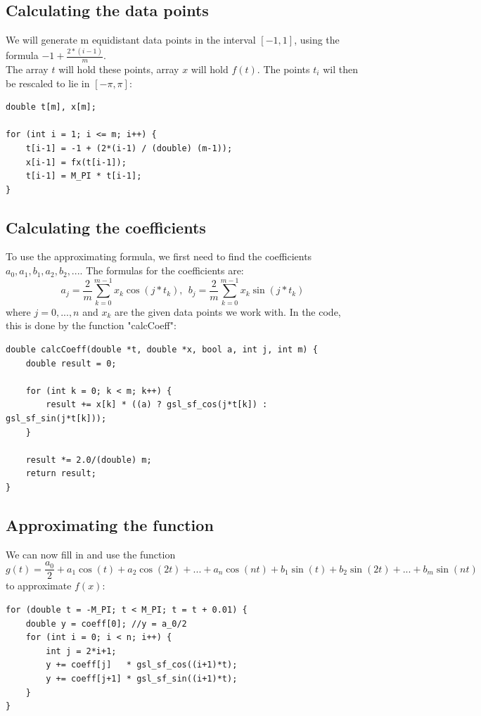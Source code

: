 \documentclass[11pt, a4paper, titlepage, openright]{article}
\begin{document}
    \subsection{Calculating the data points}
    We will generate m equidistant data points in the interval \([-1, 1]\), using the formula \( -1 + \frac{2*(i-1)}{m} \).  \\
    The array \(t\) will hold these points, array \(x\) will hold \( f(t) \). The points \(t_i\) wil then be rescaled to lie in \( [-\pi, \pi] \):
\begin{lstlisting}
double t[m], x[m];

for (int i = 1; i <= m; i++) {
    t[i-1] = -1 + (2*(i-1) / (double) (m-1));
    x[i-1] = fx(t[i-1]);
    t[i-1] = M_PI * t[i-1];
}
\end{lstlisting}
    \subsection{Calculating the coefficients}
    To use the approximating formula, we first need to find the coefficients \( a_0, a_1, b_1, a_2, b_2, ... \).
    The formulas for the coefficients are:
    \[ a_j = \frac{2}{m} \sum_{k=0}^{m-1}x_k \cos(j*t_k),\ \  b_j = \frac{2}{m} \sum_{k=0}^{m-1}x_k \sin(j*t_k) \]
    where \( j = 0, ..., n \) and \( x_k \) are the given data points we work with.
    In the code, this is done by the function "calcCoeff":
\begin{lstlisting}
double calcCoeff(double *t, double *x, bool a, int j, int m) {
    double result = 0;

    for (int k = 0; k < m; k++) {
        result += x[k] * ((a) ? gsl_sf_cos(j*t[k]) : gsl_sf_sin(j*t[k]));
    }

    result *= 2.0/(double) m;
    return result;
}
\end{lstlisting}
    \newpage
    \subsection{Approximating the function}
    We can now fill in and use the function
    \[ g(t) = \frac{a_0}{2} + a_1 \cos (t) + a_2 \cos(2t) + ... + a_n \cos(nt) + b_1 \sin (t) + b_2 \sin (2t) + ... + b_m \sin (nt) \]
    to approximate \(f(x)\):
    \\
\begin{lstlisting}
for (double t = -M_PI; t < M_PI; t = t + 0.01) {
    double y = coeff[0]; //y = a_0/2
    for (int i = 0; i < n; i++) {
        int j = 2*i+1;
        y += coeff[j]   * gsl_sf_cos((i+1)*t);
        y += coeff[j+1] * gsl_sf_sin((i+1)*t);
    }
}
\end{lstlisting}
    
\end{document}
